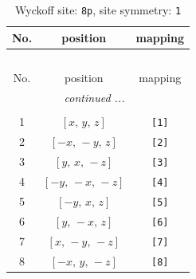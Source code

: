 \documentclass[fleqn,8pt]{jsarticle}
\begin{document}
\renewcommand{\arraystretch}{1.2}
\begin{longtable}{ccc}
\caption{Wyckoff site: {\tt 8p}, site symmetry: {\tt 1}}
 \\
 \hline \hline
No. & position & mapping \\ \hline \endfirsthead

\multicolumn{2}{l}{\tablename\ \thetable{}} \\
 \hline \hline
No. & position & mapping \\ \hline \endhead

 \hline \hline
\multicolumn{2}{r}{\footnotesize\it continued ...} \\ \endfoot

 \hline \hline
\multicolumn{2}{r}{} \\ \endlastfoot

1 & $\left[ x,\, y,\, z \right]$ & {\tt [1]} \\ \hline
2 & $\left[ - x,\, - y,\, z \right]$ & {\tt [2]} \\ \hline
3 & $\left[ y,\, x,\, - z \right]$ & {\tt [3]} \\ \hline
4 & $\left[ - y,\, - x,\, - z \right]$ & {\tt [4]} \\ \hline
5 & $\left[ - y,\, x,\, z \right]$ & {\tt [5]} \\ \hline
6 & $\left[ y,\, - x,\, z \right]$ & {\tt [6]} \\ \hline
7 & $\left[ x,\, - y,\, - z \right]$ & {\tt [7]} \\ \hline
8 & $\left[ - x,\, y,\, - z \right]$ & {\tt [8]} \\
\end{longtable}
\end{document}
